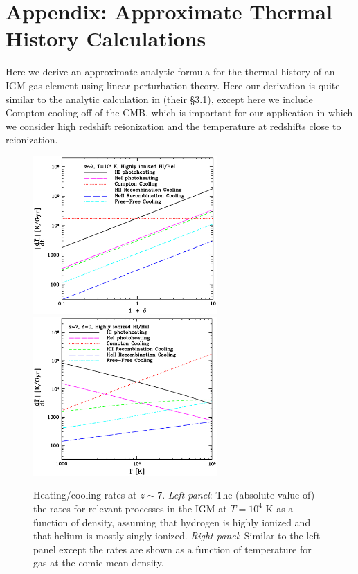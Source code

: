 \section*{Appendix: Approximate Thermal History Calculations}


Here we derive an approximate analytic formula for the thermal history of an IGM gas element using
linear perturbation theory. 
Here our derivation is quite similar to the analytic calculation in
\citet{Hui:1997dp} (their \S 3.1), except here we include Compton cooling off of the CMB, which is important for our application in which
we consider high redshift reionization and the temperature at redshifts close to reionization.


\begin{figure}[t]
\includegraphics[width=7cm]{f15a.eps}
\includegraphics[width=7cm]{f15b.eps}
\caption{Heating/cooling rates at $z \sim 7$. {\it Left panel}: The (absolute value of) the rates for relevant processes in the 
IGM at $T=10^4$ K as a function of density,
assuming that hydrogen is highly ionized and that helium is mostly singly-ionized. {\it Right panel}: Similar to the
left panel except the rates are shown as a function of temperature for gas at the comic mean density.}
\label{fig:temp_rates}
\end{figure}

